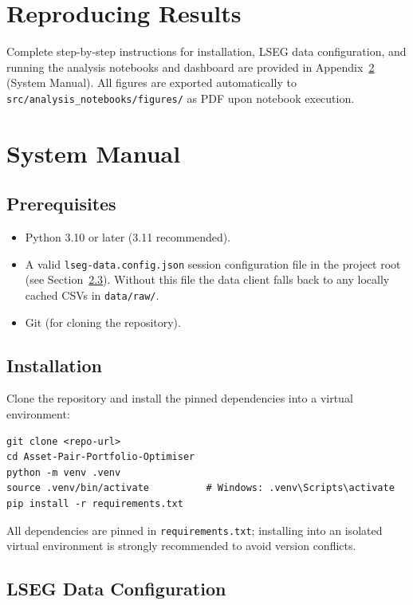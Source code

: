\documentclass[a4paper]{report}
\begin{document}
\section{Reproducing Results}
Complete step-by-step instructions for installation, LSEG data configuration, and running the analysis notebooks and dashboard are provided in Appendix~\ref{appendix:system-manual} (System Manual).
All figures are exported automatically to \texttt{src/analysis\_notebooks/figures/} as PDF upon notebook execution.

\section{System Manual}%
\label{appendix:system-manual}

\subsection{Prerequisites}

\begin{itemize}
    \item Python 3.10 or later (3.11 recommended).
    \item A valid \texttt{lseg-data.config.json} session configuration file in the project root (see Section~\ref{sec:lseg-config}).  Without this file the data client falls back to any locally cached CSVs in \texttt{data/raw/}.
    \item Git (for cloning the repository).
\end{itemize}

\subsection{Installation}

Clone the repository and install the pinned dependencies into a virtual environment:

\begin{Verbatim}[fontsize=\small, baselinestretch=0.9]
git clone <repo-url>
cd Asset-Pair-Portfolio-Optimiser
python -m venv .venv
source .venv/bin/activate          # Windows: .venv\Scripts\activate
pip install -r requirements.txt
\end{Verbatim}

All dependencies are pinned in \texttt{requirements.txt}; installing into an isolated virtual environment is strongly recommended to avoid version conflicts.

\subsection{LSEG Data Configuration}
\label{sec:lseg-config}
\end{document}
